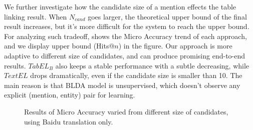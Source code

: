 We further investigate how the candidate size of a mention effects the table linking result.
When $N_{cand}$ goes larger, the theoretical upper bound of the final result increases,
but it's more difficult for the system to reach the upper bound.
For analyzing such tradeoff,
 shows the Micro Accuracy trend of each approach,
and we display upper bound (Hits@$n$) in the figure.
Our approach is more adaptive to different size of candidates,
and can produce promising end-to-end results.
$TabEL_B$ also keeps a stable performance with a subtle decreasing, 
while $TextEL$ drops dramatically, even if the candidate size is smaller than 10.
The main reason is that BLDA model is unsupervised, which doesn't observe any explicit
(mention, entity) pair for learning.



\begin{figure}[th]
\centering
\caption{Results of Micro Accuracy varied from different size of candidates,
using Baidu translation only.}
\label{fig:main-result}
\end{figure}




